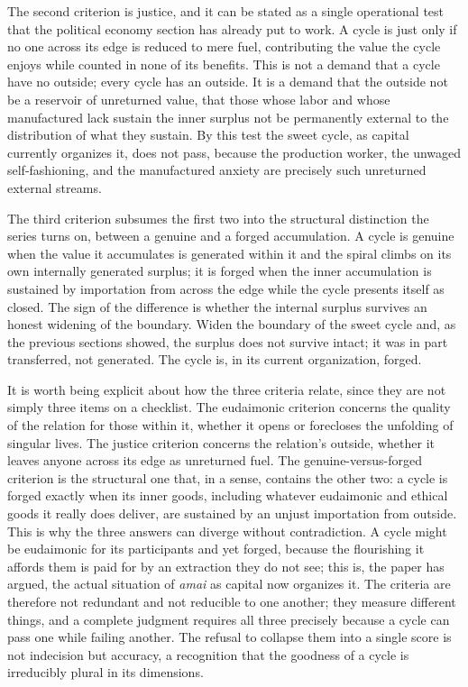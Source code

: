 The second criterion is justice, and it can be stated as a single operational test that the political economy section has already put to work. A cycle is just only if no one across its edge is reduced to mere fuel, contributing the value the cycle enjoys while counted in none of its benefits. This is not a demand that a cycle have no outside; every cycle has an outside. It is a demand that the outside not be a reservoir of unreturned value, that those whose labor and whose manufactured lack sustain the inner surplus not be permanently external to the distribution of what they sustain. By this test the sweet cycle, as capital currently organizes it, does not pass, because the production worker, the unwaged self-fashioning, and the manufactured anxiety are precisely such unreturned external streams.

The third criterion subsumes the first two into the structural distinction the series turns on, between a genuine and a forged accumulation. A cycle is genuine when the value it accumulates is generated within it and the spiral climbs on its own internally generated surplus; it is forged when the inner accumulation is sustained by importation from across the edge while the cycle presents itself as closed. The sign of the difference is whether the internal surplus survives an honest widening of the boundary. Widen the boundary of the sweet cycle and, as the previous sections showed, the surplus does not survive intact; it was in part transferred, not generated. The cycle is, in its current organization, forged.

It is worth being explicit about how the three criteria relate, since they are not simply three items on a checklist. The eudaimonic criterion concerns the quality of the relation for those within it, whether it opens or forecloses the unfolding of singular lives. The justice criterion concerns the relation's outside, whether it leaves anyone across its edge as unreturned fuel. The genuine-versus-forged criterion is the structural one that, in a sense, contains the other two: a cycle is forged exactly when its inner goods, including whatever eudaimonic and ethical goods it really does deliver, are sustained by an unjust importation from outside. This is why the three answers can diverge without contradiction. A cycle might be eudaimonic for its participants and yet forged, because the flourishing it affords them is paid for by an extraction they do not see; this is, the paper has argued, the actual situation of \textit{amai} as capital now organizes it. The criteria are therefore not redundant and not reducible to one another; they measure different things, and a complete judgment requires all three precisely because a cycle can pass one while failing another. The refusal to collapse them into a single score is not indecision but accuracy, a recognition that the goodness of a cycle is irreducibly plural in its dimensions.

